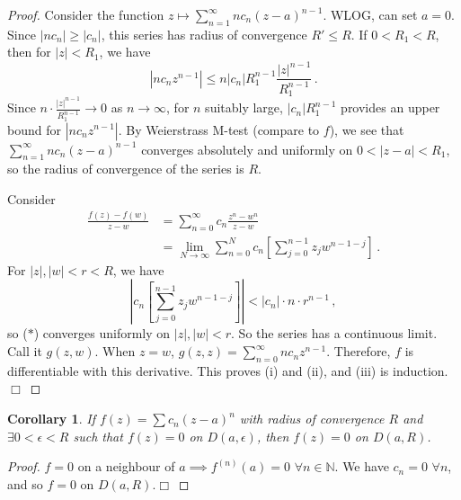 \documentclass{article}
\theoremstyle{plain}\theoremheaderfont{\normalfont\itshape}\theorembodyfont{\rmfamily}\theoremseparator{.}\newtheorem*{rem}{Remark}\newtheorem*{ex}{Example}\newtheorem*{proof}{Proof}\newtheorem*{altp}{Alternative proof}\newtheorem*{con}{Consequences}\newtheorem*{notn}{Notations}\newtheorem*{cau}{Caution}\newtheorem*{term}{Terminology}\newtheorem*{keyex}{Key example}
\theoremstyle{plain}\theoremheaderfont{\normalfont\bfseries}\theorembodyfont{\rmfamily}\theoremseparator{.}\newtheorem{thm}{Theorem}[section]\newtheorem{lem}[thm]{Lemma}\newtheorem{prop}[thm]{Proposition}\newtheorem*{cor}{Corollary}\newtheorem{defn}[thm]{Definition}\newtheorem{clm}[thm]{Claim}\newtheorem{clminproof}{Claim}\newtheorem{leminproof}{Lemma}\newtheorem{app}{Application}
\theoremstyle{break}\theoremheaderfont{\normalfont\itshape}\theorembodyfont{\rmfamily}\theoremseparator{.\medskip}\newtheorem*{proofskip}{Proof}\newtheorem*{exs}{Examples}\newtheorem*{rems}{Remarks}\newtheorem*{rec}{Recall}\newtheorem*{ppts}{Properties}
\theoremstyle{break}\theoremheaderfont{\normalfont\bfseries}\theorembodyfont{\rmfamily}\theoremseparator{.\medskip}\newtheorem{lemskip}[thm]{Lemma}\newtheorem{defnskip}[thm]{Definition}\newtheorem{propskip}[thm]{Proposition}\newtheorem{thmskip}[thm]{Theorem}
\numberwithin{equation}{section}
\newcommand{\qed}{\hfill\ensuremath{\Box}}
\newcommand{\abs}[1]{\left|#1\right|}
\newcommand{\NN}{\mathbb{N}}
\begin{document}
    \begin{proof}
        Consider the function \(z\mapsto\sum_{n=1}^{\infty}nc_n(z-a)^{n-1}\). WLOG, can set \(a=0\). Since \(\abs{nc_n}\ge\abs{c_n}\), this series has radius of convergence \(R'\le R\). If \(0<R_1<R\), then for \(\abs{z}<R_1\), we have
        \[\abs{nc_nz^{n-1}}\le n\abs{c_n}R_1^{n-1}\frac{\abs{z}^{n-1}}{R_1^{n-1}}\,.\]
        Since \(n\cdot\frac{\abs{z}^{n-1}}{R_1^{n-1}}\to 0\) as \(n\to\infty\), for \(n\) suitably large, \(\abs{c_n}R_1^{n-1}\) provides an upper bound for \(\abs{nc_n z^{n-1}}\). By Weierstrass M-test (compare to \(f\)), we see  that \(\sum_{n=1}^{\infty}nc_n(z-a)^{n-1}\) converges absolutely and uniformly on \(0<\abs{z-a}<R_1\), so the radius of convergence of the series is \(R\).

        Consider
        \begin{align*}
            \frac{f(z)-f(w)}{z-w}&=\sum_{n=0}^{\infty}c_n\frac{z^n-w^n}{z-w}\\
            &=\lim_{N\to\infty}\sum_{n=0}^{N}c_n\left[\sum_{j=0}^{n-1}z_j w^{n-1-j}\right]\,.\tag{\(*\)}
        \end{align*}
        For \(\abs{z},\abs{w}<r<R\), we have
        \[\abs{c_n\left[\sum_{j=0}^{n-1}z_jw^{n-1-j}\right]}<\abs{c_n}\cdot n\cdot r^{n-1}\,,\]
        so (\(*\)) converges uniformly on \(\abs{z},\abs{w}<r\). So the series has a continuous limit. Call it \(g(z,w)\). When \(z=w\), \(g(z,z)=\sum_{n=0}^{\infty}nc_nz^{n-1}\). Therefore, \(f\) is differentiable with this derivative. This proves (i) and (ii), and (iii) is induction.\qed
    \end{proof}
    \begin{cor}
        If \(f(z)=\sum c_n(z-a)^n\) with radius of convergence \(R\) and \(\exists 0<\epsilon<R\) such that \(f(z)=0\) on \(D(a,\epsilon)\), then \(f(z)=0\) on \(D(a,R)\).
    \end{cor}
    \begin{proof}
        \(f=0\) on a neighbour of \(a\implies f^{(n)}(a)=0\) \(\forall n\in\NN\). We have \(c_n=0\) \(\forall n\), and so \(f=0\) on \(D(a,R)\).\qed 
    \end{proof}
\end{document}
